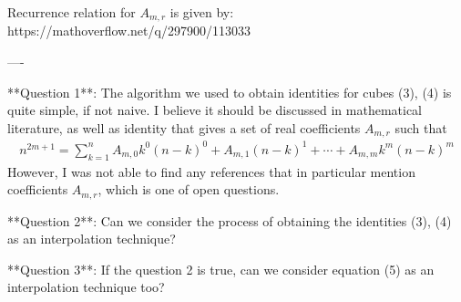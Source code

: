 Recurrence relation for $A_{m,r}$ is given by: https://mathoverflow.net/q/297900/113033

----

**Question 1**: The algorithm we used to obtain identities for
cubes (3), (4) is quite simple, if not naive.
I believe it should be discussed in mathematical literature, as well as identity
that gives a set of real coefficients $A_{m,r}$ such that
\begin{align*}
    n^{2m+1} = \sum_{k=1}^{n} A_{m,0} k^0 (n-k)^0 + A_{m,1} (n-k)^1
    + \cdots + A_{m,m} k^m (n-k)^m
\end{align*}
However, I was not able to find any references that in particular mention coefficients $A_{m,r}$,
which is one of open questions.


**Question 2**: Can we consider the process of obtaining the identities (3), (4) as an interpolation technique?

**Question 3**: If the question 2 is true, can we consider equation (5) as an interpolation technique too?
